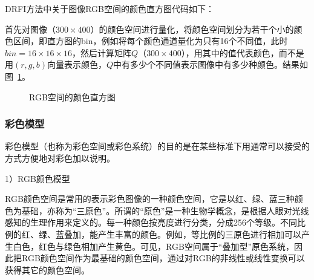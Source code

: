 \documentclass[12pt]{article}
\begin{document}
DRFI方法中关于图像RGB空间的颜色直方图代码如下：



首先对图像（$300 \times 400$）的颜色空间进行量化，将颜色空间划分为若干个小的颜色区间，即直方图的bin，例如将每个颜色通道量化为只有16个不同值，此时$bin = 16 \times 16 \times 16$，然后计算矩阵$Q$（$300 \times 400$），用其中的值代表颜色，而不是用$(r, g, b)$向量表示颜色，$Q$中有多少个不同值表示图像中有多少种颜色。结果如图~\ref{fig: RGBhistogram}。

\begin{figure}
  \centering 
  \caption{RGB空间的颜色直方图}
  \label{fig: RGBhistogram} %
\end{figure}

\subsubsection{彩色模型}

彩色模型（也称为彩色空间或彩色系统）的目的是在某些标准下用通常可以接受的方式方便地对彩色加以说明。

1）RGB颜色模型

RGB颜色空间是常用的表示彩色图像的一种颜色空间，它是以红、绿、蓝三种颜色为基础，亦称为“三原色”。所谓的“原色”是一种生物学概念，是根据人眼对光线感知的生理作用来定义的。每一种颜色按亮度进行分类，分成256个等级。不同比例的红、绿、蓝叠加，能产生丰富的颜色。例如，等比例的三原色进行相加可以产生白色，红色与绿色相加产生黄色。可见，RGB空间属于“叠加型”原色系统，因此把RGB颜色空间作为最基础的颜色空间，通过对RGB的非线性或线性变换可以获得其它的颜色空间。
\end{document}
